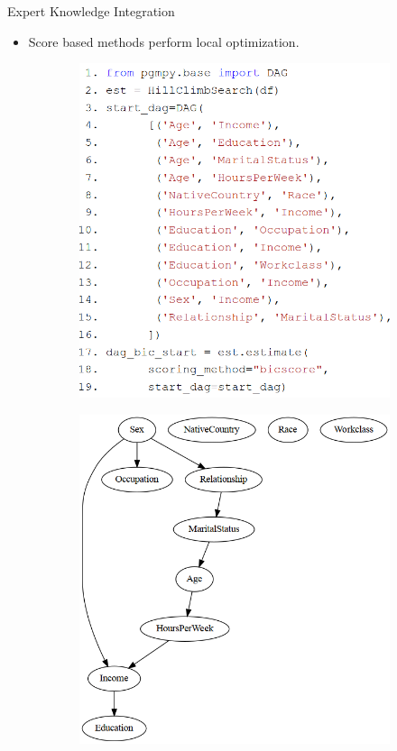 \documentclass{beamer}
\begin{document}
\begin{frame}{Expert Knowledge Integration}
	\begin{itemize}
		\item Score based methods perform local optimization.
	\end{itemize}

	\begin{figure}
		\begin{subfigure}{0.55 \textwidth}
			\centering
			\includegraphics[scale=0.28]{imgs/adult_start.png}
		\end{subfigure}%
		\begin{subfigure}{0.45 \textwidth}
			\centering
			\includegraphics[scale=0.28]{imgs/adult_bic_start.png}

\end{subfigure}
\end{figure}
\end{frame}
\end{document}
